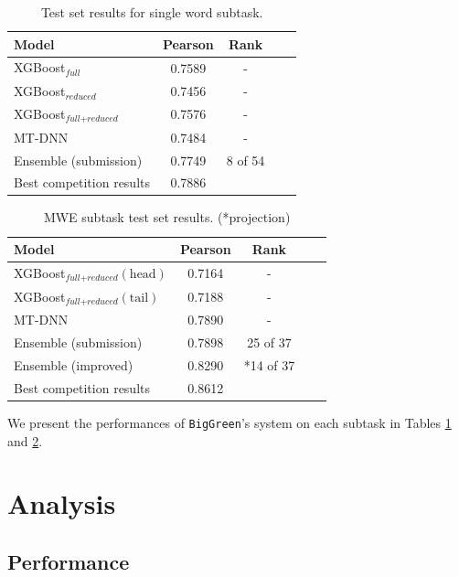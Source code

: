 \documentclass[11pt,a4paper]{article}
\begin{document}
\begin{table}
  \centering
  \begin{tabular}{lcccc}
  \hline \textbf{Model} & \textbf{Pearson} & \textbf{Rank} & \\ \hline
  XGBoost$_\textit{full}$ &	0.7589 & - \\
  XGBoost$_\textit{reduced}$ &	0.7456 & - \\
  XGBoost$_{\textit{full}+\textit{reduced}}$ & 0.7576 & - \\
  MT-DNN & 0.7484 & - \\
  Ensemble (submission) & 0.7749 & 8 of 54 \\
  \hline
  Best competition results & 0.7886 & \\ 
  \hline
  \end{tabular}
  \caption{\label{tab:single-word-results} Test set results for single word subtask.}
\end{table}

\begin{table}
  \centering
  \begin{tabular}{lcccc}
  \hline \textbf{Model} & \textbf{Pearson} & \textbf{Rank} \\ \hline
  XGBoost$_{\textit{full}+\textit{reduced}}(\text{head})$ & 0.7164 & - \\
  XGBoost$_{\textit{full}+\textit{reduced}}(\text{tail})$ & 0.7188 & - \\
  MT-DNN & 0.7890 & - \\
  Ensemble (submission) & 0.7898 & 25 of 37 \\
  Ensemble (improved) & 0.8290 & *14 of 37 \\
  \hline
  Best competition results & 0.8612 & \\ 
  \hline
  \end{tabular}
  \caption{\label{tab:multi-word-results} MWE subtask test set results. (*projection)}
\end{table}

We present the performances of \texttt{BigGreen}'s system on each subtask in Tables \ref{tab:single-word-results} and \ref{tab:multi-word-results}.

\section{Analysis}

\subsection{Performance}
\end{document}
